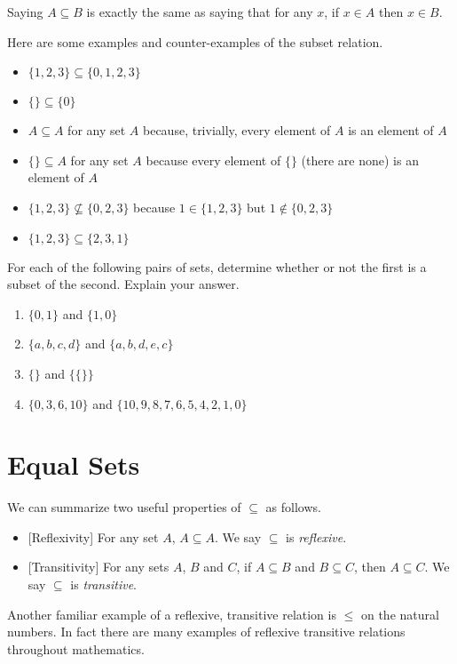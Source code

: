 Saying $A\subseteq B$ is exactly the same as saying that for any $x$, if $x\in A$ then $x\in B$.

\begin{example}
  Here are some examples and counter-examples of the subset relation.
  \begin{itemize}
  \item $\{1,2,3\}\subseteq \{0,1,2,3\}$
  \item $\{\}\subseteq \{0\}$
  \item $A\subseteq A$ for any set $A$ because, trivially, every
    element of $A$ is an element of $A$
  \item $\{\} \subseteq A$ for any set $A$ because every element of
    $\{\}$ (there are none) is an element of $A$
  \item $\{1,2,3\}\not\subseteq \{0,2,3\}$ because $1\in \{1,2,3\}$
    but $1\notin \{0,2,3\}$
  \item $\{1,2,3\}\subseteq \{2,3,1\}$
  \end{itemize}
\end{example}

\ipadbreak

\begin{exercises}
	For each of the following pairs of sets, determine whether or
  not the first is a subset of the second. Explain your answer.
  \begin{enumerate}
  \item $\{0,1\}$ and $\{1,0\}$
  \item $\{a,b,c,d\}$ and $\{a,b,d,e,c\}$
  \item $\{\}$ and $\{\{\}\}$
  \item $\{0,3,6,10\}$ and $\{10,9,8,7,6,5,4,2,1, 0\}$
  \end{enumerate}
\end{exercises}

\section*{Equal Sets}

We can summarize two
useful properties of $\subseteq$ as follows.
\begin{itemize}
	\item{}[Reflexivity]  For any set $A$, $A \subseteq A$. We say $\subseteq$ is \emph{reflexive}.
	\item{}[Transitivity] For any sets $A$, $B$ and $C$,
	if $A\subseteq B$ and $B\subseteq C$, then $A\subseteq C$. We say $\subseteq$ is \emph{transitive}.
\end{itemize}
Another familiar example of a reflexive, transitive
relation is $\leq$ on the natural numbers. In fact there are many examples of reflexive transitive relations throughout mathematics. 

